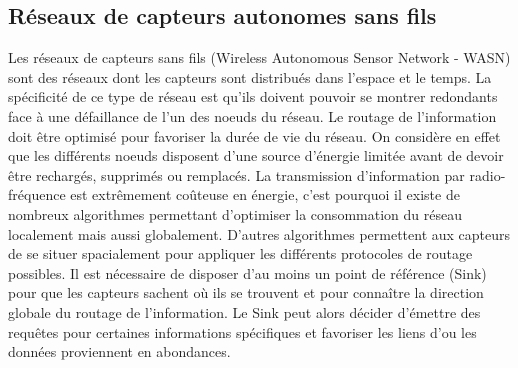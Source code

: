 \documentclass[10pt, article]{llncs}
\begin{document}
		\subsection{Réseaux de capteurs autonomes sans fils}
			Les réseaux de capteurs sans fils (Wireless Autonomous Sensor Network - WASN) sont des réseaux dont les capteurs sont distribués dans l'espace et le temps. La spécificité de ce type de réseau est qu'ils doivent pouvoir se montrer redondants face à une défaillance de l'un des noeuds du réseau. Le routage de l'information doit être optimisé pour favoriser la durée de vie du réseau. On considère en effet que les différents noeuds disposent d'une source d'énergie limitée avant de devoir être rechargés, supprimés ou remplacés. La transmission d'information par radio-fréquence est extrêmement coûteuse en énergie, c'est pourquoi il existe de nombreux algorithmes permettant d'optimiser la consommation du réseau localement mais aussi globalement. D'autres algorithmes permettent aux capteurs de se situer spacialement pour appliquer les différents protocoles de routage possibles. Il est nécessaire de disposer d'au moins un point de référence (Sink) pour que les capteurs sachent où ils se trouvent et pour connaître la direction globale du routage de l'information. Le Sink peut alors décider d'émettre des requêtes pour certaines informations spécifiques et favoriser les liens d'ou les données proviennent en abondances.\\
\end{document}
